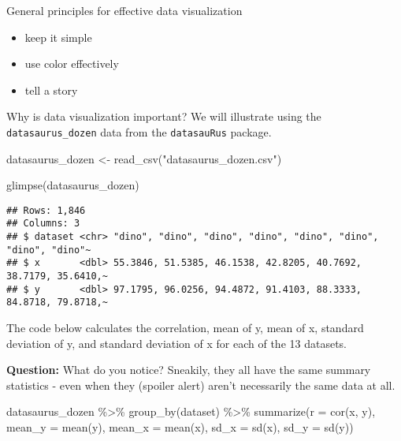 \documentclass[
]{article}
\newenvironment{Shaded}{\begin{snugshade}}{\end{snugshade}}
\newcommand{\AttributeTok}[1]{\textcolor[rgb]{0.77,0.63,0.00}{#1}}
\newcommand{\FunctionTok}[1]{\textcolor[rgb]{0.00,0.00,0.00}{#1}}
\newcommand{\NormalTok}[1]{#1}
\newcommand{\OtherTok}[1]{\textcolor[rgb]{0.56,0.35,0.01}{#1}}
\newcommand{\SpecialCharTok}[1]{\textcolor[rgb]{0.00,0.00,0.00}{#1}}
\newcommand{\StringTok}[1]{\textcolor[rgb]{0.31,0.60,0.02}{#1}}
\providecommand{\tightlist}{%
  \setlength{\itemsep}{0pt}\setlength{\parskip}{0pt}}
\begin{document}
General principles for effective data visualization

\begin{itemize}
\tightlist
\item
  keep it simple
\item
  use color effectively
\item
  tell a story
\end{itemize}

Why is data visualization important? We will illustrate using the
\texttt{datasaurus\_dozen} data from the \texttt{datasauRus} package.

\begin{Shaded}
\begin{Highlighting}[]
\NormalTok{datasaurus\_dozen }\OtherTok{\textless{}{-}} \FunctionTok{read\_csv}\NormalTok{(}\StringTok{"datasaurus\_dozen.csv"}\NormalTok{)}
\end{Highlighting}
\end{Shaded}

\begin{Shaded}
\begin{Highlighting}[]
\FunctionTok{glimpse}\NormalTok{(datasaurus\_dozen)}
\end{Highlighting}
\end{Shaded}

\begin{verbatim}
## Rows: 1,846
## Columns: 3
## $ dataset <chr> "dino", "dino", "dino", "dino", "dino", "dino", "dino", "dino"~
## $ x       <dbl> 55.3846, 51.5385, 46.1538, 42.8205, 40.7692, 38.7179, 35.6410,~
## $ y       <dbl> 97.1795, 96.0256, 94.4872, 91.4103, 88.3333, 84.8718, 79.8718,~
\end{verbatim}

The code below calculates the correlation, mean of y, mean of x,
standard deviation of y, and standard deviation of x for each of the 13
datasets.

\textbf{Question:} What do you notice? Sneakily, they all have the same
summary statistics - even when they (spoiler alert) aren't necessarily
the same data at all.

\begin{Shaded}
\begin{Highlighting}[]
\NormalTok{datasaurus\_dozen }\SpecialCharTok{\%\textgreater{}\%} 
   \FunctionTok{group\_by}\NormalTok{(dataset) }\SpecialCharTok{\%\textgreater{}\%}
   \FunctionTok{summarize}\NormalTok{(}\AttributeTok{r =} \FunctionTok{cor}\NormalTok{(x, y), }
             \AttributeTok{mean\_y =} \FunctionTok{mean}\NormalTok{(y),}
             \AttributeTok{mean\_x =} \FunctionTok{mean}\NormalTok{(x),}
             \AttributeTok{sd\_x =} \FunctionTok{sd}\NormalTok{(x),}
             \AttributeTok{sd\_y =} \FunctionTok{sd}\NormalTok{(y))}
\end{Highlighting}
\end{Shaded}
\end{document}
